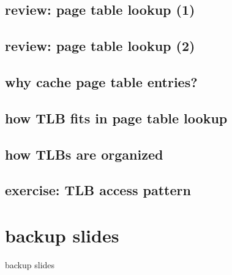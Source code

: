 \subsection{review: page table lookup (1)}


\subsection{review: page table lookup (2)}

\subsection{why cache page table entries?}


\subsection{how TLB fits in page table lookup}


\subsection{how TLBs are organized}

\subsection{exercise: TLB access pattern}


\section{backup slides}
\begin{frame}{backup slides}
\end{frame}


